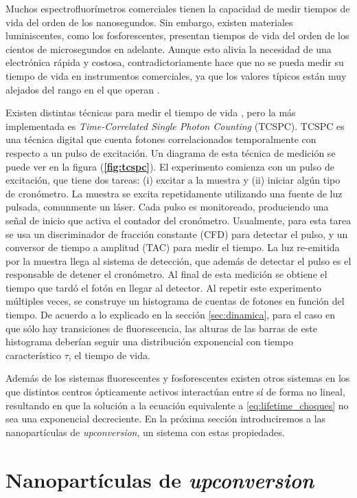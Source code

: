 Muchos espectrofluorímetros comerciales tienen la capacidad de medir tiempos de vida del orden de los nanosegundos. 
Sin embargo, existen materiales luminiscentes, como los fosforescentes, presentan tiempos de vida del orden de los cientos de microsegundos en adelante.
Aunque esto alivia la necesidad de una electrónica rápida y costosa, contradictoriamente hace que no se pueda medir su tiempo de vida en instrumentos comerciales, ya que los valores típicos están muy alejados del rango en el que operan \cite{bujjamer2020}.

Existen distintas técnicas para medir el tiempo de vida \cite{becker_fluorescence_2012}, pero la más implementada es \textit{Time-Correlated Single Photon Counting} (TCSPC).
TCSPC es una técnica digital que cuenta fotones correlacionados temporalmente con respecto a un pulso de excitación.
Un diagrama de esta técnica de medición se puede ver en la figura (\textbf{\ref{fig:tcspc}}).
El experimento comienza con un pulso de excitación, que tiene dos tareas: (i) excitar a la muestra y (ii) iniciar algún tipo de cronómetro.
La muestra se excita repetidamente utilizando una fuente de luz pulsada, comunmente un láser.
Cada pulso es monitoreado, produciendo una señal de inicio que activa el contador del cronómetro.
Usualmente, para esta tarea se usa un discriminador de fracción constante (CFD) para detectar el pulso, y un conversor de tiempo a amplitud (TAC) para medir el tiempo.
La luz re-emitida por la muestra llega al sistema de detección, que además de detectar el pulso es el responsable de detener el cronómetro.
Al final de esta medición se obtiene el tiempo que tardó el fotón en llegar al detector.
Al repetir este experimento múltiples veces, se construye un histograma de cuentas de fotones en función del tiempo.
De acuerdo a lo explicado en la sección \ref{sec:dinamica}, para el caso en que sólo hay transiciones de fluorescencia, las alturas de las barras de este histograma deberían seguir una distribución exponencial con tiempo característico $\tau$, el tiempo de vida.

Además de los sistemas fluorescentes y fosforescentes existen otros sistemas en los que distintos centros ópticamente activos interactúan entre sí de forma no lineal, resultando en que la solución a la ecuación equivalente a \ref{eq:lifetime_choques} no sea una exponencial decreciente.
En la próxima sección introduciremos a las nanopartículas de \textit{upconversion}, un sistema con estas propiedades.


\section{Nanopartículas de \textit{upconversion}} \label{sec:intro_ucnp}

